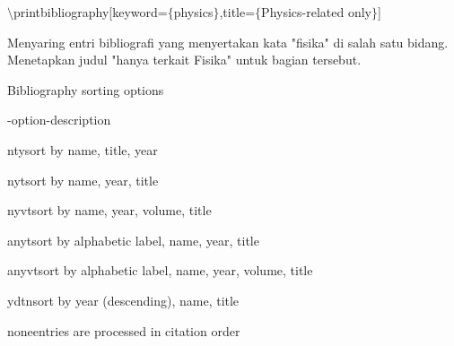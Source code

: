 \begin{itemize}
$\setminus$printbibliography[keyword=$ \{ $physics$ \} $,title=$ \{ $Physics-related only$ \} $]\par

Menyaring entri bibliografi yang menyertakan kata "fisika" di salah satu bidang. Menetapkan judul "hanya terkait Fisika" untuk bagian tersebut.\par

Bibliography sorting options\par

-option\hspace*{0.5in}\hspace*{0.5in}\hspace*{0.5in}-description\par

nty\hspace*{0.5in}\hspace*{0.5in}\hspace*{0.5in}sort by name, title, year\par

nyt\hspace*{0.5in}\hspace*{0.5in}\hspace*{0.5in}sort by name, year, title\par

nyvt\hspace*{0.5in}\hspace*{0.5in}\hspace*{0.5in}sort by name, year, volume, title\par

anyt\hspace*{0.5in}\hspace*{0.5in}\hspace*{0.5in}sort by alphabetic label, name, year, title\par

anyvt\hspace*{0.5in}\hspace*{0.5in}\hspace*{0.5in}sort by alphabetic label, name, year, volume, title\par

ydtn\hspace*{0.5in}\hspace*{0.5in}\hspace*{0.5in}sort by year (descending), name, title\par

none\hspace*{0.5in}\hspace*{0.5in}\hspace*{0.5in}entries are processed in citation order\par


\end{itemize}
